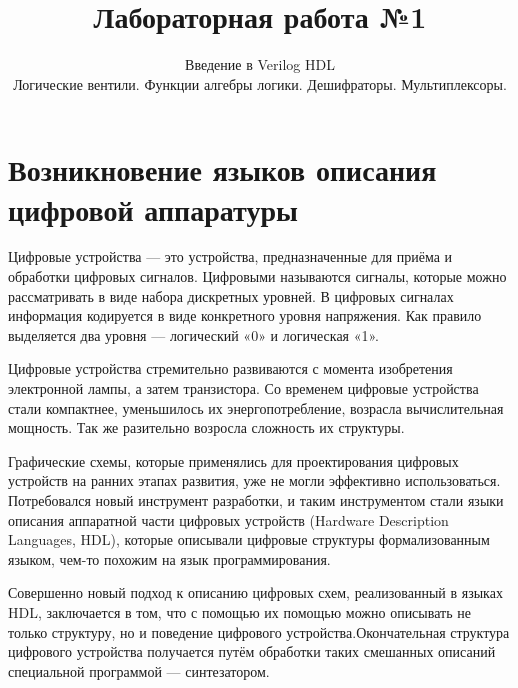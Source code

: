 \documentclass[a5paper, DIV=16, headings=openany, twoside=true,fontsize=10pt, titlepage]{scrreprt}
\begin{document}
\rofoot*{\pagemark}
\lofoot*{}
\lefoot*{\pagemark}

\sloppy

\title{Лабораторная работа №1}
\author{}
\subject{}
\subtitle{Введение в Verilog HDL \\ Логические вентили. Функции алгебры логики. Дешифраторы. Мультиплексоры.}
\titlehead{}
\publishers{}
\date{}


\maketitle{}


\chapter{Возникновение языков описания цифровой аппаратуры}

\par{Цифровые устройства — это устройства, предназначенные для приёма и обработки цифровых сигналов. Цифровыми называются сигналы, которые можно рассматривать в виде набора дискретных уровней. В цифровых сигналах информация кодируется в виде конкретного уровня напряжения. Как правило выделяется два уровня — логический «0» и логическая «1».}

\par{Цифровые устройства стремительно развиваются с момента изобретения электронной лампы, а затем транзистора. Со временем цифровые устройства стали компактнее, уменьшилось их энергопотребление, возрасла вычислительная мощность. Так же разительно возросла сложность их структуры.}

\par{Графические схемы, которые применялись для проектирования цифровых устройств на ранних этапах развития, уже не могли эффективно использоваться. Потребовался новый инструмент разработки, и таким инструментом стали языки описания аппаратной части цифровых устройств (\foreignlanguage{english}{Hardware Description Languages, HDL}), которые описывали цифровые структуры формализованным языком, чем-то похожим на язык программирования.}

\par{Совершенно новый подход к описанию цифровых схем, реализованный в языках \foreignlanguage{english}{HDL}, заключается в том, что с помощью их помощью можно описывать не только структуру, но и поведение цифрового устройства.Окончательная структура цифрового устройства получается путём обработки таких смешанных описаний специальной программой — синтезатором.}
\end{document}
